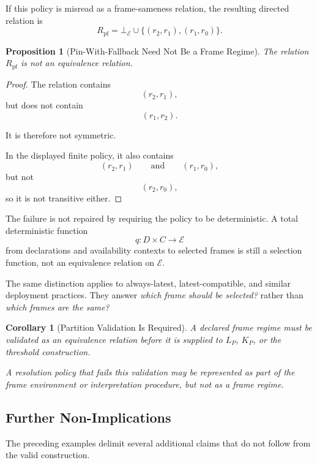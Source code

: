 \documentclass[11pt]{article}
\theoremstyle{plain}
\newtheorem{proposition}[theorem]{Proposition}
\newtheorem{corollary}[theorem]{Corollary}
\theoremstyle{definition}
\theoremstyle{remark}
\begin{document}
If this policy is misread as a frame-sameness relation,
the resulting directed relation is
\[
  R_{\mathrm{pf}}
  =
  \bot_{\mathcal{E}}
  \cup
  \{
  (r_2,r_1),
  (r_1,r_0)
  \}.
\]

\begin{proposition}[Pin-With-Fallback Need Not Be a Frame Regime]
  \label{ik.prop.pin-fallback}
  The relation \(R_{\mathrm{pf}}\)
  is not an equivalence relation.
\end{proposition}

\begin{proof}
  The relation contains
  \[
    (r_2,r_1),
  \]
  but does not contain
  \[
    (r_1,r_2).
  \]

  It is therefore not symmetric.

  In the displayed finite policy,
  it also contains
  \[
    (r_2,r_1)
    \qquad\text{and}\qquad
    (r_1,r_0),
  \]
  but not
  \[
    (r_2,r_0),
  \]
  so it is not transitive either.
\end{proof}

The failure is not repaired
by requiring the policy to be deterministic.
A total deterministic function
\[
  q:
  D\times C
  \longrightarrow
  \mathcal{E}
\]
from declarations and availability contexts
to selected frames
is still a selection function,
not an equivalence relation
on \(\mathcal{E}\).

The same distinction applies to
always-latest,
latest-compatible,
and similar deployment practices.
They answer
\emph{which frame should be selected?}
rather than
\emph{which frames are the same?}

\begin{corollary}[Partition Validation Is Required]
  \label{ik.cor.partition-validation}
  A declared frame regime
  must be validated as an equivalence relation
  before it is supplied to
  \(L_P\),
  \(K_P\),
  or the threshold construction.

  A resolution policy that fails this validation
  may be represented as part of the frame environment
  or interpretation procedure,
  but not as a frame regime.
\end{corollary}

\subsection{Further Non-Implications}

The preceding examples delimit
several additional claims
that do not follow from the valid construction.
\end{document}
